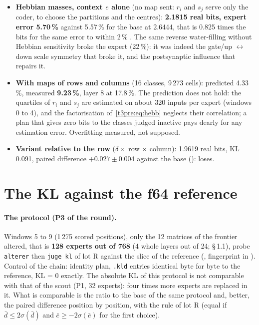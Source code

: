 \begin{itemize}
\item \textbf{Hebbian masses, context $e$ alone} (no map sent: $r_i$ and $s_j$ serve only the coder, to choose the partitions and the centres): \textbf{2.1815 real bits, expert error 5.70\,\%} against 5.57\,\% for the base at 2.6444, that is 0.825 times the bits for the same error to within 2\,\% \mes. The same reverse water-filling without Hebbian sensitivity broke the expert (22\,\%): it was indeed the gate/up $\leftrightarrow$ down scale symmetry that broke it, and the postsynaptic influence that repairs it.
\item \textbf{With maps of rows and columns} (16 classes, 9\,273 cells): predicted 4.33\,\%, measured \textbf{9.23\,\%}, layer 8 at 17.8\,\%. The prediction does not hold: the quartiles of $r_i$ and $s_j$ are estimated on about 320 inputs per expert (windows 0 to 4), and the factorisation of~\eqref{t3pre:eq:hebb} neglects their correlation; a plan that gives zero bits to the classes judged inactive pays dearly for any estimation error. Overfitting measured, not supposed.
\item \textbf{Variant relative to the row} ($\delta \times$ row $\times$ column): 1.9619 real bits, KL 0.091, paired difference $+0.027 \pm 0.004$ against the base (): loses.
\end{itemize}

\section{The KL against the f64 reference}\label{t3pre:sec:kl}

\paragraph{The protocol (P3 of the round).} Windows 5 to 9 (1\,275 scored positions), only the 12 matrices of the frontier altered, that is \textbf{128 experts out of 768} (4 whole layers out of 24;  §\,1.1), probe \texttt{alterer} then \texttt{juge kl} of lot R against the slice of the reference (, fingerprint in ). Control of the chain: identity plan, \texttt{.kld} entries identical byte for byte to the reference, KL = 0 exactly. The absolute KL of this protocol is not comparable with that of the scout (P1, 32 experts): four times more experts are replaced in it. What is comparable is the ratio to the base of the same protocol and, better, the paired difference position by position, with the rule of lot R (equal if $\bar d \le 2\sigma(\bar d)$ and $\bar e \ge -2\sigma(\bar e)$ for the first choice).

